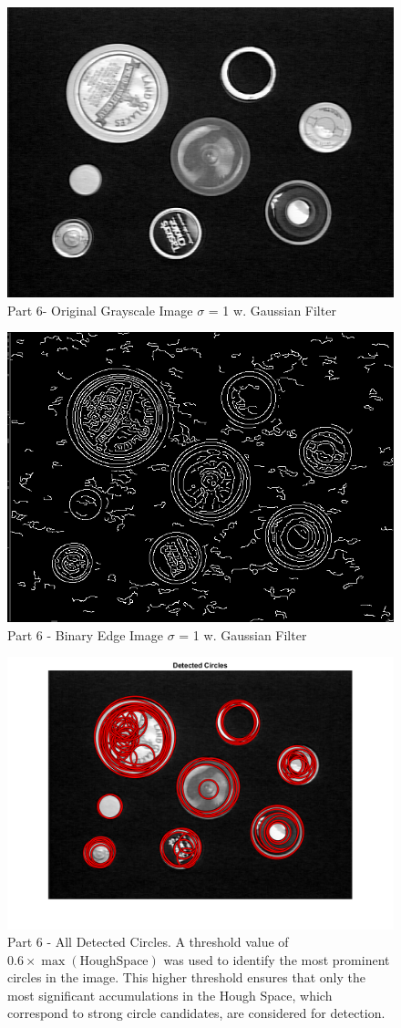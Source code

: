 \documentclass[12pt]{article}
\begin{document}
\begin{figure}
	\centering
	\includegraphics[width=0.7\linewidth]{original_grayscale_image_2024-02-17_142108}
	\caption{Part 6- Original Grayscale Image $\sigma$ = 1 w. Gaussian Filter}
	\label{fig:originalgrayscaleimage2024-02-17142108}
\end{figure}

\begin{figure}
	\centering
	\includegraphics[width=0.7\linewidth]{binary_edge_image_2024-02-17_142108}
	\caption{Part 6 - Binary Edge Image $\sigma$ = 1 w. Gaussian Filter}
	\label{fig:binaryedgeimage2024-02-17142108}
\end{figure}
\begin{figure}
	\centering
	\includegraphics[width=0.7\linewidth]{all_detected_circles_2024-02-17_142108}
	\caption{Part 6 - All Detected Circles. A threshold value of $0.6 \times \max(\text{HoughSpace})$ was used to identify the most prominent circles in the image. This higher threshold ensures that only the most significant accumulations in the Hough Space, which correspond to strong circle candidates, are considered for detection.}
	\label{fig:alldetectedcircles2024-02-17142108}
\end{figure}
\cleardoublepage
\end{document}
